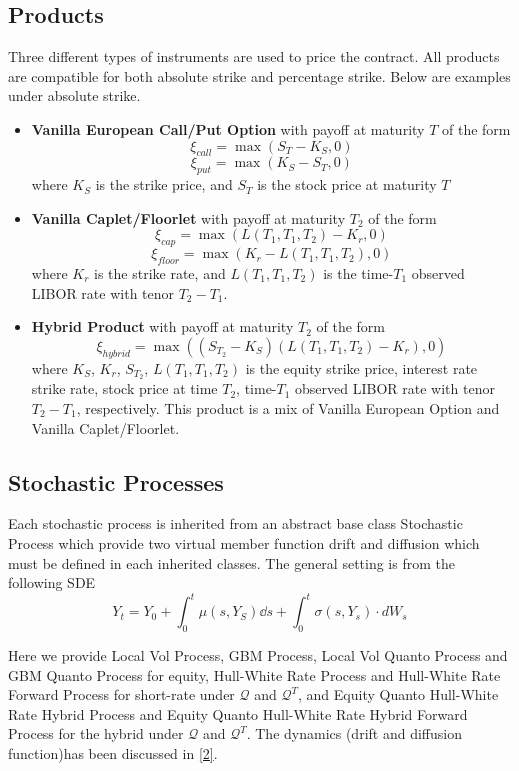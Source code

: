 \documentclass[11pt]{article}
\numberwithin{equation}{section}
\theoremstyle{remark}
\begin{document}
\subsection{Products}\label{4.2}
Three different types of instruments are used to price the contract. All products are compatible for both absolute strike and percentage strike. Below are examples under absolute strike.

\begin{itemize}
\item \textbf{Vanilla European Call/Put Option} with payoff at maturity $T$ of the form
$$ \xi_{call} = \max \left(S_T-K_S, 0\right)$$
$$ \xi_{put} = \max \left(K_S-S_T, 0\right)$$
where $K_S$ is the strike price, and $S_T$ is the stock price at maturity $T$

\item \textbf{Vanilla Caplet/Floorlet} with payoff at maturity $T_2$ of the form
$$ \xi_{cap} = \max \left(L(T_1, T_1, T_2)-K_r, 0\right)$$
$$ \xi_{floor} = \max \left(K_r-L(T_1, T_1, T_2), 0\right)$$
where $K_r$ is the strike rate, and $L(T_1, T_1, T_2)$ is the time-$T_1$ observed LIBOR rate with tenor $T_2-T_1$.

\item \textbf{Hybrid Product} with payoff at maturity $T_2$ of the form
$$ \xi_{hybrid} = \max \left((S_{T_2}-K_S)(L(T_1, T_1, T_2)-K_r), 0\right) $$
where $K_S$, $K_r$, $S_{T_2}$, $L(T_1, T_1, T_2)$ is the equity strike price, interest rate strike rate, stock price at time $T_2$, time-$T_1$ observed LIBOR rate with tenor $T_2-T_1$, respectively. This product is a mix of Vanilla European Option and Vanilla Caplet/Floorlet.
\end{itemize}

\subsection{Stochastic Processes}\label{4.3}
Each stochastic process is inherited from an abstract base class Stochastic Process which provide two virtual member function drift and diffusion which must be defined in each inherited classes. The general setting is from the following SDE
$$Y_t=Y_0 + \int_0^t \mu(s,Y_S) \dd s+ \int_0^t \sigma(s,Y_s)\cdot dW_s$$

Here we provide Local Vol Process, GBM Process, Local Vol Quanto Process and GBM Quanto Process for equity, Hull-White Rate Process and Hull-White Rate Forward Process for short-rate under $\mathcal{Q}$ and $\mathcal{Q}^T$, and Equity Quanto Hull-White Rate Hybrid Process and Equity Quanto Hull-White Rate Hybrid Forward Process for the hybrid under $\mathcal{Q}$ and $\mathcal{Q}^T$. The dynamics (drift and diffusion function)has been discussed in \ref{2}.
\end{document}
